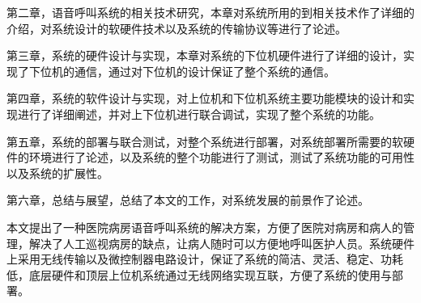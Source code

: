 第二章，语音呼叫系统的相关技术研究，本章对系统所用的到相关技术作了详细的介绍，对系统设计的软硬件技术以及系统的传输协议等进行了论述。

第三章，系统的硬件设计与实现，本章对系统的下位机硬件进行了详细的设计，实现了下位机的通信，通过对下位机的设计保证了整个系统的通信。

第四章，系统的软件设计与实现，对上位机和下位机系统主要功能模块的设计和实现进行了详细阐述，并对上下位机进行联合调试，实现了整个系统的功能。

第五章，系统的部署与联合测试，对整个系统进行部署，对系统部署所需要的软硬件的环境进行了论述，以及系统的整个功能进行了测试，测试了系统功能的可用性以及系统的扩展性。

第六章，总结与展望，总结了本文的工作，对系统发展的前景作了论述。

本文提出了一种医院病房语音呼叫系统的解决方案，方便了医院对病房和病人的管理，解决了人工巡视病房的缺点，让病人随时可以方便地呼叫医护人员。系统硬件上采用无线传输以及微控制器电路设计，保证了系统的简洁、灵活、稳定、功耗低，底层硬件和顶层上位机系统通过无线网络实现互联，方便了系统的使用与部署。
